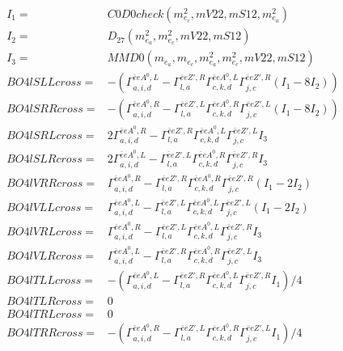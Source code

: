 \documentclass[A4,landscape]{article}
\begin{document}
\begin{align} 
I_1 = & C0D0check(m^2_{e_{{c}}}, mV22, mS12, m^2_{e_{{a}}}) \\ 
I_2 = & D_{27}(m^2_{e_{{a}}}, m^2_{e_{{c}}}, mV22, mS12) \\ 
I_3 = & MMD0(m_{e_{{a}}}, m_{e_{{c}}}, m^2_{e_{{a}}}, m^2_{e_{{c}}}, mV22, mS12) \\ 
  BO4lSLLcross= & -( \Gamma^{\bar{e}e A^0 ,L}_{a, i, d} - \Gamma^{\bar{e}e {Z'} ,R} _{l, a} \Gamma^{\bar{e}e A^0 ,L}_{c, k, d} \Gamma^{\bar{e}e {Z'} ,R}_{j, c} (I_1 - 8 I_2)) \\ 
  BO4lSRRcross= & -( \Gamma^{\bar{e}e A^0 ,R}_{a, i, d} - \Gamma^{\bar{e}e {Z'} ,L} _{l, a} \Gamma^{\bar{e}e A^0 ,R}_{c, k, d} \Gamma^{\bar{e}e {Z'} ,L}_{j, c} (I_1 - 8 I_2)) \\ 
  BO4lSRLcross= & 2  \Gamma^{\bar{e}e A^0 ,R}_{a, i, d} - \Gamma^{\bar{e}e {Z'} ,R} _{l, a} \Gamma^{\bar{e}e A^0 ,L}_{c, k, d} \Gamma^{\bar{e}e {Z'} ,L}_{j, c} I_3 \\ 
  BO4lSLRcross= & 2  \Gamma^{\bar{e}e A^0 ,L}_{a, i, d} - \Gamma^{\bar{e}e {Z'} ,L} _{l, a} \Gamma^{\bar{e}e A^0 ,R}_{c, k, d} \Gamma^{\bar{e}e {Z'} ,R}_{j, c} I_3 \\ 
  BO4lVRRcross= &  \Gamma^{\bar{e}e A^0 ,R}_{a, i, d} - \Gamma^{\bar{e}e {Z'} ,R} _{l, a} \Gamma^{\bar{e}e A^0 ,R}_{c, k, d} \Gamma^{\bar{e}e {Z'} ,R}_{j, c} (I_1 - 2 I_2) \\ 
  BO4lVLLcross= &  \Gamma^{\bar{e}e A^0 ,L}_{a, i, d} - \Gamma^{\bar{e}e {Z'} ,L} _{l, a} \Gamma^{\bar{e}e A^0 ,L}_{c, k, d} \Gamma^{\bar{e}e {Z'} ,L}_{j, c} (I_1 - 2 I_2) \\ 
  BO4lVRLcross= &  \Gamma^{\bar{e}e A^0 ,R}_{a, i, d} - \Gamma^{\bar{e}e {Z'} ,L} _{l, a} \Gamma^{\bar{e}e A^0 ,L}_{c, k, d} \Gamma^{\bar{e}e {Z'} ,R}_{j, c} I_3 \\ 
  BO4lVLRcross= &  \Gamma^{\bar{e}e A^0 ,L}_{a, i, d} - \Gamma^{\bar{e}e {Z'} ,R} _{l, a} \Gamma^{\bar{e}e A^0 ,R}_{c, k, d} \Gamma^{\bar{e}e {Z'} ,L}_{j, c} I_3 \\ 
  BO4lTLLcross= & -( \Gamma^{\bar{e}e A^0 ,L}_{a, i, d} - \Gamma^{\bar{e}e {Z'} ,R} _{l, a} \Gamma^{\bar{e}e A^0 ,L}_{c, k, d} \Gamma^{\bar{e}e {Z'} ,R}_{j, c} I_1)/4 \\ 
  BO4lTLRcross= & 0 \\ 
  BO4lTRLcross= & 0 \\ 
  BO4lTRRcross= & -( \Gamma^{\bar{e}e A^0 ,R}_{a, i, d} - \Gamma^{\bar{e}e {Z'} ,L} _{l, a} \Gamma^{\bar{e}e A^0 ,R}_{c, k, d} \Gamma^{\bar{e}e {Z'} ,L}_{j, c} I_1)/4 \\ 
\end{align} 
\end{document}
